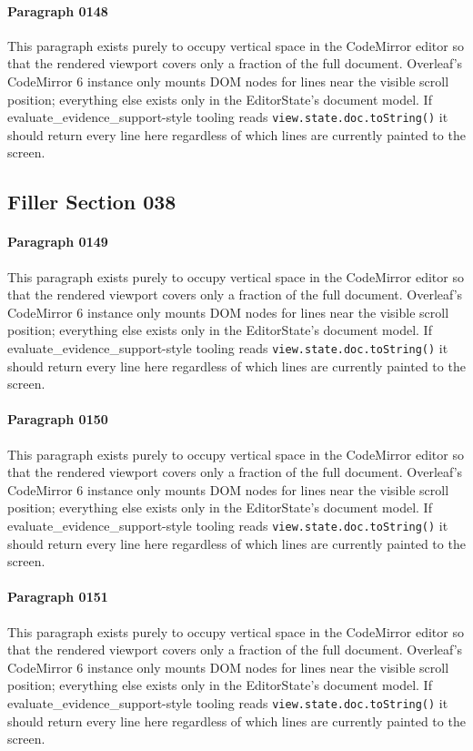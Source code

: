 \documentclass{article}
\begin{document}
\paragraph{Paragraph 0148}
This paragraph exists purely to occupy vertical space in the CodeMirror editor so that the rendered viewport covers only a fraction of the full document. Overleaf's CodeMirror 6 instance only mounts DOM nodes for lines near the visible scroll position; everything else exists only in the EditorState's document model. If evaluate\_evidence\_support-style tooling reads \texttt{view.state.doc.toString()} it should return every line here regardless of which lines are currently painted to the screen.

\subsection{Filler Section 038}
\paragraph{Paragraph 0149}
This paragraph exists purely to occupy vertical space in the CodeMirror editor so that the rendered viewport covers only a fraction of the full document. Overleaf's CodeMirror 6 instance only mounts DOM nodes for lines near the visible scroll position; everything else exists only in the EditorState's document model. If evaluate\_evidence\_support-style tooling reads \texttt{view.state.doc.toString()} it should return every line here regardless of which lines are currently painted to the screen.

\paragraph{Paragraph 0150}
This paragraph exists purely to occupy vertical space in the CodeMirror editor so that the rendered viewport covers only a fraction of the full document. Overleaf's CodeMirror 6 instance only mounts DOM nodes for lines near the visible scroll position; everything else exists only in the EditorState's document model. If evaluate\_evidence\_support-style tooling reads \texttt{view.state.doc.toString()} it should return every line here regardless of which lines are currently painted to the screen.

\paragraph{Paragraph 0151}
This paragraph exists purely to occupy vertical space in the CodeMirror editor so that the rendered viewport covers only a fraction of the full document. Overleaf's CodeMirror 6 instance only mounts DOM nodes for lines near the visible scroll position; everything else exists only in the EditorState's document model. If evaluate\_evidence\_support-style tooling reads \texttt{view.state.doc.toString()} it should return every line here regardless of which lines are currently painted to the screen.
\end{document}

